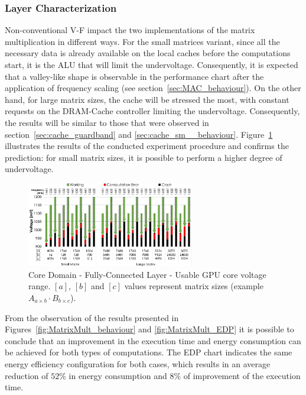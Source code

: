 \subsubsection{Layer Characterization}

Non-conventional V-F impact the two implementations of the matrix multiplication in different ways. For the small matrices variant, 
since all the necessary data is already available on the local caches before the computations start, 
it is the ALU that will limit the undervoltage. Consequently, it is expected that a valley-like shape is observable in the performance chart after the application of frequency scaling (see section~\ref{sec:MAC_behaviour}). On the other hand, for large matrix sizes, the cache will be stressed the most, with constant requests on the DRAM-Cache controller limiting the undervoltage. Consequently, the results will be similar to those that were observed in section~\ref{sec:cache_guardband} and \ref{sec:cache_sm__behaviour}. Figure~\ref{fig:MatrixMult_guardband} illustrates the results of the conducted experiment procedure and confirms the prediction: for small matrix sizes, it is possible to perform a higher degree of undervoltage. 


\begin{figure}[htbp]
    \centering
        \includegraphics[width=0.65\textwidth]{Figures/Application To Deep Learning/MatrixMul_guardband.pdf}
        \caption{Core Domain - Fully-Connected Layer - Usable GPU core voltage range. $[a]$, $[b]$ and $[c]$ values represent matrix sizes (example $A_{a \times b} \cdot B_{b \times c}$).}
    \label{fig:MatrixMult_guardband}
\end{figure}


From the observation of the results presented in Figures~\ref{fig:MatrixMult_behaviour} and \ref{fig:MatrixMult_EDP} it is possible to conclude that an improvement in the execution time and energy consumption can be achieved for both types of computations. The EDP chart indicates the same energy efficiency configuration for both cases, which results in an average reduction of $52\%$ in energy consumption and $8\%$ of improvement of the execution time.


